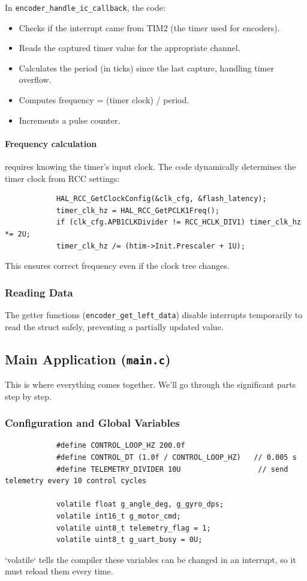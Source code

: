 \documentclass[12pt,a4paper]{article}
\begin{document}
		In \texttt{encoder\_handle\_ic\_callback}, the code:
		\begin{itemize}
			\item Checks if the interrupt came from TIM2 (the timer used for encoders).
			\item Reads the captured timer value for the appropriate channel.
			\item Calculates the period (in ticks) since the last capture, handling timer overflow.
			\item Computes frequency = (timer clock) / period.
			\item Increments a pulse counter.
		\end{itemize}
		\paragraph{Frequency calculation} requires knowing the timer’s input clock. The code dynamically determines the timer clock from RCC settings:
		\begin{lstlisting}
			HAL_RCC_GetClockConfig(&clk_cfg, &flash_latency);
			timer_clk_hz = HAL_RCC_GetPCLK1Freq();
			if (clk_cfg.APB1CLKDivider != RCC_HCLK_DIV1) timer_clk_hz *= 2U;
			timer_clk_hz /= (htim->Init.Prescaler + 1U);
		\end{lstlisting}
		This ensures correct frequency even if the clock tree changes.
		
		\subsubsection{Reading Data}
		The getter functions (\texttt{encoder\_get\_left\_data}) disable interrupts temporarily to read the struct safely, preventing a partially updated value.
		
		\subsection{Main Application (\texttt{main.c})}
		This is where everything comes together. We'll go through the significant parts step by step.
		
		\subsubsection{Configuration and Global Variables}
		\begin{lstlisting}
			#define CONTROL_LOOP_HZ 200.0f
			#define CONTROL_DT (1.0f / CONTROL_LOOP_HZ)   // 0.005 s
			#define TELEMETRY_DIVIDER 10U                  // send telemetry every 10 control cycles
			
			volatile float g_angle_deg, g_gyro_dps;
			volatile int16_t g_motor_cmd;
			volatile uint8_t telemetry_flag = 1;
			volatile uint8_t g_uart_busy = 0U;
		\end{lstlisting}
		`volatile` tells the compiler these variables can be changed in an interrupt, so it must reload them every time.
		
\end{document}
